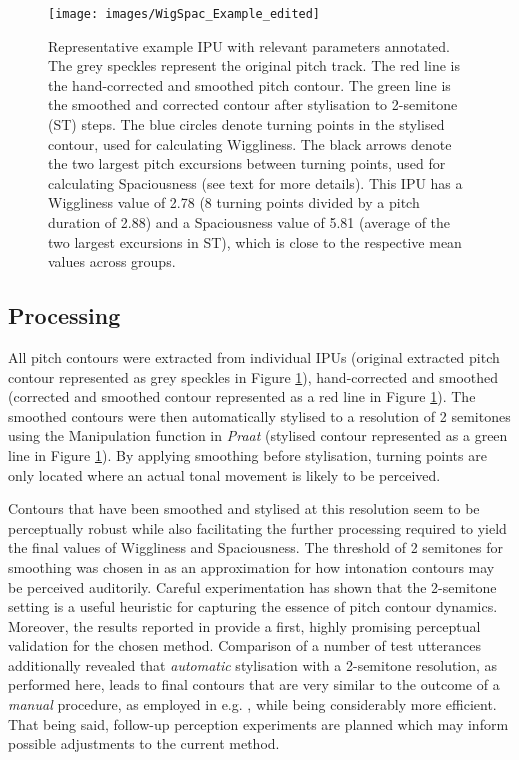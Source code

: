\begin{figure}
	
	{\texttt{[image: images/WigSpac\_Example\_edited]}
		
	}
	
	\caption{Representative example IPU with relevant parameters annotated. The grey speckles represent the original pitch track. The red line is the hand-corrected and smoothed pitch contour. The green line is the smoothed and corrected contour after stylisation to 2-semitone (ST) steps. The blue circles denote turning points in the stylised contour, used for calculating Wiggliness. The black arrows denote the two largest pitch excursions between turning points, used for calculating Spaciousness (see text for more details).
		This IPU has a Wiggliness value of 2.78 (8 turning points divided by a pitch duration of 2.88) and a Spaciousness value of 5.81 (average of the two largest excursions in ST), which is close to the respective mean values across groups.\\}\label{fig:WigSpacExample}
\end{figure}

	\subsection{Processing}\label{int_analysis_processing}

All pitch contours were extracted from individual IPUs (original extracted pitch contour represented as grey speckles in Figure \ref{fig:WigSpacExample}), hand-corrected and smoothed \citep{cangemiMausmooth2015a} (corrected and smoothed contour represented as a red line in Figure \ref{fig:WigSpacExample}). The smoothed contours were then automatically stylised to a resolution of 2 semitones using the Manipulation function in \textit{Praat} \citep{boersmaPRAATDoingPhonetics2021} (stylised contour represented as a green line in Figure \ref{fig:WigSpacExample}). By applying smoothing before stylisation, turning points are only located where an actual tonal movement is likely to be perceived.

Contours that have been smoothed and stylised at this resolution seem to be perceptually robust while also facilitating the further processing required to yield the final values of Wiggliness and Spaciousness. The threshold of 2 semitones for smoothing was chosen in \citet{wehrleSomewhereSpectrumRobotic2018} as an approximation for how intonation contours may be perceived auditorily. Careful experimentation has shown that the 2-semitone setting is a useful heuristic for capturing the essence of pitch contour dynamics. Moreover, the results reported in \citet{wehrleEvaluatingProsodicAspects2023} provide a first, highly promising perceptual validation for the chosen method. Comparison of a number of test utterances additionally revealed that \emph{automatic} stylisation with a 2-semitone resolution, as performed here, leads to final contours that are very similar to the outcome of a \emph{manual} procedure, as employed in e.g. \citet{mennenCrosslanguageDifferencesFundamental2012a}, while being considerably more efficient. That being said, follow-up perception experiments are planned which may inform possible adjustments to the current method.

